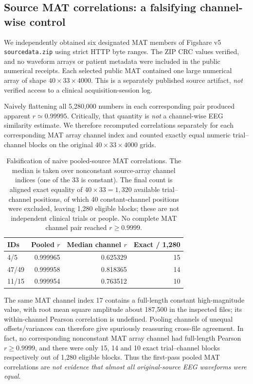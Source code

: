 \subsection{Source MAT correlations: a falsifying channel-wise control}
\label{sec:p2-source-MAT}
We independently obtained six designated
MAT members of Figshare v5 \texttt{sourcedata.zip}
using strict HTTP byte ranges. The ZIP
CRC values verified, and no waveform
arrays or patient metadata were included
in the public numerical receipts.
Each selected public MAT contained one
large numerical array of shape
$40\times33\times4000$.
This is a separately published source
artifact, \emph{not} verified access to
a clinical acquisition-session log.

Naively flattening all 5,280,000
numbers in each corresponding
pair produced apparent
$r\simeq0.99995$. Critically, that
quantity is \emph{not} a
channel-wise EEG similarity estimate.
We therefore recomputed correlations
separately for each corresponding
MAT array channel index and counted
exactly equal numeric trial--channel
blocks on the original
$40\times33\times4000$ grids.
\begin{table}[tb]
\centering\small
\caption{Falsification of naive pooled-source
MAT correlations. The median is
taken over nonconstant source-array
channel indices (one of the 33 is
constant). The final count is
aligned exact equality of
$40\times33=1,320$ available
trial--channel positions, of which
40 constant-channel positions were
excluded, leaving 1,280 eligible
blocks; these are not
independent clinical trials or people.
No complete MAT channel pair reached
$r\geq0.9999$.}
\label{tab:p2-source-mat-initial}
\setlength{\tabcolsep}{3.5pt}
\begin{tabular}{lrrr}
\toprule
IDs & Pooled $r$ & Median channel $r$ & Exact / 1,280\\
\midrule
4/5   & 0.999965 & 0.625329 & 15\\
47/49 & 0.999958 & 0.818365 & 14\\
11/15 & 0.999954 & 0.763512 & 10\\
\bottomrule
\end{tabular}
\end{table}

The same MAT channel index 17
contains a full-length constant
high-magnitude value, with root
mean square amplitude about 187,500
in the inspected files; its
within-channel Pearson correlation
is undefined. Pooling channels of
unequal offsets/variances can therefore
give spuriously reassuring
cross-file agreement. In fact,
no corresponding nonconstant
MAT array channel had full-length
Pearson $r\geq0.9999$, and there
were only 15, 14 and 10
exact trial--channel blocks
respectively out of 1,280 eligible blocks.
Thus the first-pass pooled MAT correlations are
\emph{not evidence that almost all original-source
EEG waveforms were equal}.

